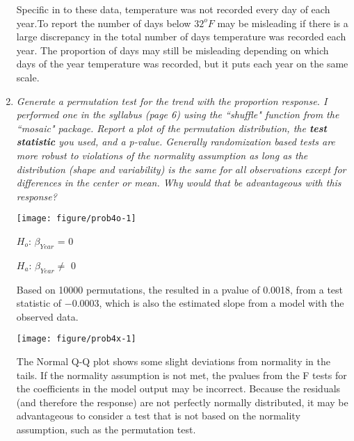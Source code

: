 \documentclass[11pt]{article}
\begin{document}
\begin{enumerate}
Specific in to these data, temperature was not recorded every day of each year.To report the number of days below $32^{o}F$ may be misleading if there is a large discrepancy in the total number of days temperature was recorded each year. The proportion of days may still be misleading depending on which days of the year temperature was recorded, but it puts each year on the same scale.

\item%
{\it Generate a permutation test for the trend with the proportion response. I performed one in the syllabus (page 6) using the ``shuffle" function from the ``mosaic" package. Report a plot of the permutation distribution, the {\bf test statistic} you used, and a p-value. Generally randomization based tests are more robust to violations of the normality assumption as long as the distribution (shape and variability) is the same for all observations except for differences in the {\it center} or mean. Why would that be advantageous with this response?}



\begin{knitrout}\footnotesize
{}\color{fgcolor}

{\centering \texttt{[image: figure/prob4o-1]} 

}



\end{knitrout}

$H_{o}$: $\beta_{Year}$ = 0

$H_{a}$: $\beta_{Year} \neq$ 0

Based on 10000 permutations, the resulted in a pvalue of 0.0018, from a test statistic of \ensuremath{-0.0003}, which is also the estimated slope from a model with the observed data.

\begin{knitrout}\footnotesize
{}\color{fgcolor}

{\centering \texttt{[image: figure/prob4x-1]} 

}



\end{knitrout}
The Normal Q-Q plot shows some slight deviations from normality in the tails. If the normality assumption is not met, the pvalues from the F tests for the coefficients in the model output may be incorrect. Because the residuals (and therefore the response) are not perfectly normally distributed, it may be advantageous to consider a test that is not based on the normality assumption, such as the permutation test.


\end{enumerate}
\end{document}
